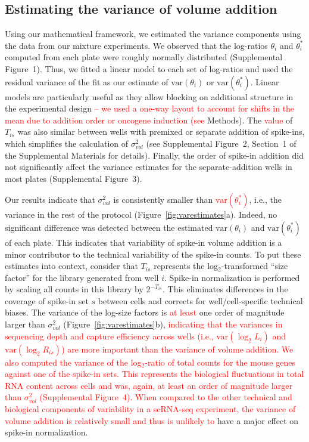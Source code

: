 \documentclass{article}
\newcommand{\suppfignorm}{1}
\newcommand{\suppfigtotals}{2}
\newcommand{\suppfigorder}{3}
\newcommand{\suppfigcell}{4}
\newcommand{\suppsecmath}{1}
\newcommand{\revised}[1]{\textcolor{red}{#1}}
\newcommand\variance{\mbox{var}}
\begin{document}
\subsection*{Estimating the variance of volume addition}
Using our mathematical framework, we estimated the variance components using the data from our mixture experiments.
We observed that the log-ratios $\theta_i$ and $\theta^*_i$ computed from each plate were roughly normally distributed (Supplemental Figure~\suppfignorm{}).
Thus, we fitted a linear model to each set of log-ratios and used the residual variance of the fit as our estimate of $\variance(\theta_i)$ or $\variance(\theta^*_i)$.
Linear models are particularly useful as they allow blocking on additional structure in the experimental design \revised{-- we used a one-way layout to account for shifts in the mean due to addition order or oncogene induction (see} Methods).
The \revised{value} of $T_{is}$ was also similar between wells with premixed or separate addition of spike-ins, which simplifies the calculation of $\sigma^2_{vol}$ (see Supplemental Figure~\suppfigtotals{}, Section~\suppsecmath{} of the Supplemental Materials for details).
Finally, the order of spike-in addition did not significantly affect the variance estimates for the separate-addition wells in most plates (Supplemental Figure~\suppfigorder{}).

Our results indicate that $\sigma^2_{vol}$ is consistently smaller than \revised{$\variance(\theta^*_i)$}, i.e., the variance in the rest of the protocol (Figure~\ref{fig:varestimates}a).
Indeed, no significant difference was detected between the estimated $\variance(\theta_i)$ and $\variance(\theta^*_i)$ of each plate.
This indicates that variability of spike-in volume addition is a minor contributor to the technical variability of the spike-in counts.
To put these estimates into context, consider that $T_{is}$ represents the log$_2$-transformed ``size factor'' for the library generated from well $i$.
Spike-in normalization is performed by scaling all counts in this library by $2^{-T_{is}}$.
This eliminates differences in the coverage of spike-in set $s$ between cells and corrects for well/cell-specific technical biases.
The variance of the log-size factors is \revised{at least} one order of magnitude larger than $\sigma^2_{vol}$ (Figure~\ref{fig:varestimates}b), \revised{indicating that the variances in sequencing depth and capture efficiency across wells (i.e., $\variance{(\log_2 L_{i})}$ and $\variance{(\log_2 R_{is})}$) are more important than the variance of volume addition.
We also computed the variance of the log$_2$-ratio of total counts for the mouse genes against one of the spike-in sets.
This represents the biological fluctuations in total RNA content across cells and was, again, at least an order of magnitude larger than $\sigma^2_{vol}$ (Supplemental Figure~\suppfigcell{}).
When compared to the other technical and biological components of variability in a scRNA-seq experiment, the variance of volume addition is relatively small and thus is unlikely to} have a major effect on spike-in normalization.
\end{document}

